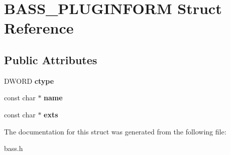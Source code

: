 \section{B\+A\+S\+S\+\_\+\+P\+L\+U\+G\+I\+N\+F\+O\+R\+M Struct Reference}
\label{struct_b_a_s_s___p_l_u_g_i_n_f_o_r_m}
\subsection*{Public Attributes}
\begin{DoxyCompactItemize}
\item 
D\+W\+O\+R\+D {\bfseries ctype}\label{struct_b_a_s_s___p_l_u_g_i_n_f_o_r_m_a93952bbca5695ff5c9e1bdc8e7271368}

\item 
const char $\ast$ {\bfseries name}\label{struct_b_a_s_s___p_l_u_g_i_n_f_o_r_m_a5df5726f10e49ea23065f691e0c4f5a4}

\item 
const char $\ast$ {\bfseries exts}\label{struct_b_a_s_s___p_l_u_g_i_n_f_o_r_m_a9aee80c1e2aa288d9e82ce5886c6a022}

\end{DoxyCompactItemize}


The documentation for this struct was generated from the following file\+:\begin{DoxyCompactItemize}
\item 
bass.\+h\end{DoxyCompactItemize}
